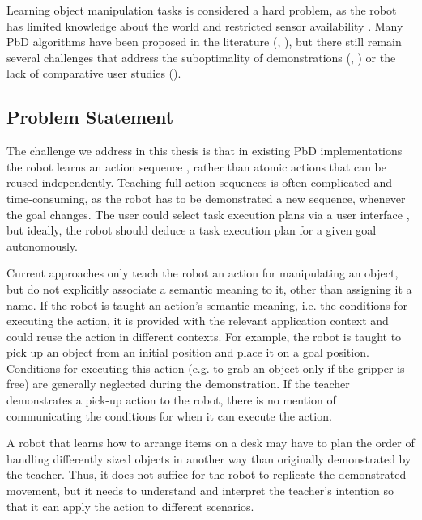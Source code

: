 Learning object manipulation tasks is considered a hard problem, as the robot has limited knowledge about the world and restricted sensor availability \cite{ekvall2008robot}.
Many PbD algorithms have been proposed in the literature (\cite{argall2009survey}, \cite{billing2010formalism}), but there still remain several challenges that address the suboptimality of demonstrations (\cite{chen2003programing}, \cite{kaiser1995obtaining}) or the lack of comparative user studies (\cite{suay2012practical}).

\subsection{Problem Statement}
The challenge we address in this thesis is that in existing PbD implementations the robot learns an action sequence \cite{orendt2016robot,peppoloni2014ros}, rather than atomic actions that can be reused independently. 
Teaching full action sequences is often complicated and time-consuming, as the robot has to be demonstrated a new sequence, whenever the goal changes.
The user could select task execution plans via a user interface \cite{guerin2015framework}, but ideally, the robot should deduce a task execution plan for a given goal autonomously.

Current approaches only teach the robot an action for manipulating an object, but do not explicitly associate a semantic meaning to it, other than assigning it a name.
If the robot is taught an action's semantic meaning, i.e. the conditions for executing the action, it is provided with the relevant application context and could reuse the action in different contexts.
For example, the robot is taught to pick up an object from an initial position and place it on a goal position.
Conditions for executing this action (e.g. to grab an object only if the gripper is free) are generally neglected during the demonstration.
If the teacher demonstrates a pick-up action to the robot, there is no mention of communicating the conditions for when it can execute the action.

A robot that learns how to arrange items on a desk may have to plan the order of handling differently sized objects in another way than originally demonstrated by the teacher.
Thus, it does not suffice for the robot to replicate the demonstrated movement, but it needs to understand and interpret the teacher's intention so that it can apply the action to different scenarios.

